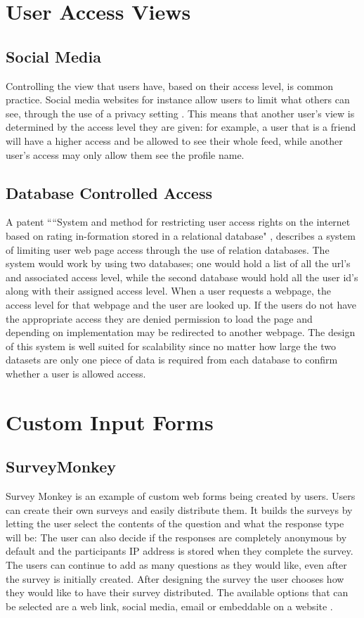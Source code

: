 \documentclass[11pt]{report}
\begin{document}
\section{User Access Views}

\subsection{Social Media}
Controlling the view that users have, based on their access level, is common practice. Social media websites for instance allow users to limit what others can see, through the use of a privacy setting \cite{tufekci_can_2008-5}. This means that another user's view is determined by the access level they are given: for example, a user that is a friend will have a higher access and be allowed to see their whole feed, while another user's access may only allow them see the profile name.

\subsection{Database Controlled Access}
A patent ``“System and method for restricting user access rights on the internet based on rating in-formation stored in a relational database" \cite{_system_1997}, describes a system of limiting user web page access through the use of relation databases. The system would work by using two databases; one would hold a list of all the url's and associated access level, while the second database would hold all the user id's along with their assigned access level. When a user requests a webpage, the access level for that webpage and the user are looked up. If the users do not have the appropriate access they are denied permission to load the page and depending on implementation may be redirected to another webpage.
The design of this system is well suited for scalability since no matter how large the two datasets are only one piece of data is required from each database to confirm whether a user is allowed access.


\section{Custom Input Forms}

\subsection{SurveyMonkey}
Survey Monkey \cite{finley_surveymonkey_1999-1} is an example of custom web forms being created by users. Users can create their own surveys and easily distribute them. It builds the surveys by letting the user select the contents of the question and what the response type will be: The user can also decide if the responses are completely anonymous by default and the participants IP address is stored when they complete the survey. The users can continue to add as many questions as they would like, even after the survey is initially created. After designing the survey the user chooses how they would like to have their survey distributed. The available options that can be selected are a web link, social media, email or embeddable on a website \cite{waclawski_how_2012-1}.
\end{document}
